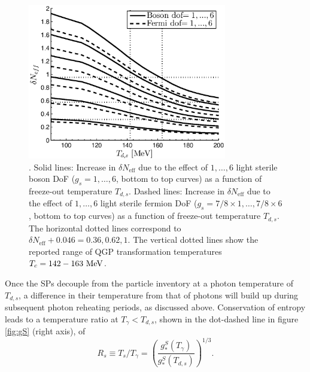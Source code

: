 \begin{figure}
\centering
\begin{minipage}[b]{.49\textwidth}
\centerline{\hspace*{0.4cm}\includegraphics[height=6.8cm]{04-birrell/QGP_Neff/Figures/Neff_Td_combined.eps}}
\end{minipage}
\caption{. Solid lines: Increase in $\delta N_{\text{eff}}$ due to the effect of $1,\dots,6$ light sterile boson DoF ($g_s=1,\dots,6$, bottom to top curves) as a function of freeze-out temperature $T_{d,s}$. Dashed lines: Increase in $\delta N_{\text{eff}}$ due to the effect of $1,\dots,6$ light sterile fermion DoF ($g_s=7/8\times 1,\dots,7/8\times 6$, bottom to top curves) as a function of freeze-out temperature $T_{d,s}$. The horizontal dotted lines correspond to $\delta N_{\text{eff}}+0.046=0.36,0.62,1$. The vertical dotted lines show the reported range of QGP transformation temperatures $T_c=142-163\text{ MeV}$.\label{fig:Neff_Td_zoom}}
\end{figure}


Once the SPs decouple from the  particle inventory at a photon temperature of $T_{d,s}$, a difference in their temperature from that of photons will build up during subsequent photon reheating periods, as discussed above. Conservation of entropy leads to a temperature ratio at $T_\gamma<T_{d,s}$, shown in the dot-dashed line in figure \ref{fig:gS} (right axis), of
\begin{equation}\label{T_ratio}
R_s\equiv T_{s}/T_{\gamma}=\left(\frac{g_*^S(T_\gamma)}{g_*^S(T_{d,s})}\right)^{1/3}.
\end{equation}


